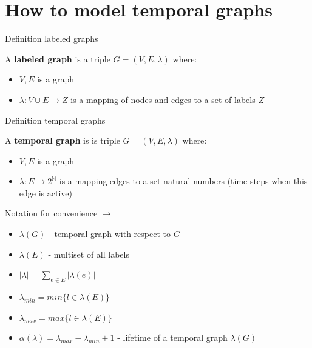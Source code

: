 \documentclass{beamer}
\begin{document}
\section{How to model temporal graphs}
\begin{frame}{Definition labeled graphs}
    \begin{tcolorbox}[definitionstyle, title=Definition]
      A \textbf{labeled graph} \citep[page 94]{GHOSH201888} is a triple \( G = (V, E, \lambda) \) where:
        \begin{itemize}
            \item \( V, E \) is a graph
            \item $ \lambda: V \cup E \rightarrow Z$ is a mapping of nodes and edges to a set of labels $Z$
          \end{itemize}
    \end{tcolorbox}
\end{frame}

\begin{frame}{Definition temporal graphs}
    \begin{tcolorbox}[definitionstyle, title=Definition]
      A \textbf{temporal graph} \citep[page 243]{Michail2015} is is triple \( G = (V, E, \lambda) \) where:
        \begin{itemize}
            \item \( V, E \) is a graph
            \item $ \lambda: E \rightarrow 2^{\mathbb{N}}$ is a mapping edges to a set natural numbers (time steps when this edge is active)
          \end{itemize}
    \end{tcolorbox}
\end{frame}

\begin{frame}{Notation for convenience $\rightarrow$ \citep[p. 243ff]{Michail2015}}
\begin{itemize}
  \item $\lambda(G)$ - temporal graph with respect to $G$
  \item $\lambda(E)$ - multiset of all labels
  \item $| \lambda | = \sum_{e \in E} | \lambda(e) | $
  \item $ \lambda_{min} = min\{l \in \lambda(E)\} $
  \item $ \lambda_{max} = max\{l \in \lambda(E)\} $
  \item $\alpha(\lambda) = \lambda_{max} - \lambda_{min} + 1$ - lifetime of a temporal graph $\lambda(G)$
\end{itemize}
\end{frame}
\end{document}
